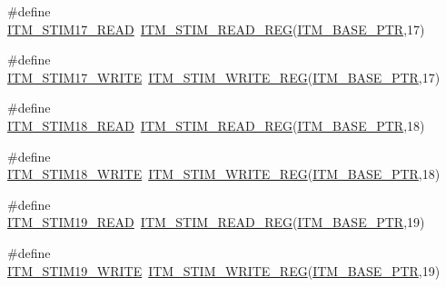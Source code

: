 \begin{DoxyCompactItemize}
\item 
\#define \hyperlink{group___i_t_m___register___accessor___macros_ga3f00966b4f023808c0d22b5c88d9ad84}{I\+T\+M\+\_\+\+S\+T\+I\+M17\+\_\+\+R\+E\+AD}~\hyperlink{group___i_t_m___register___accessor___macros_ga5009882336aadcd4f37b45cf3395c450}{I\+T\+M\+\_\+\+S\+T\+I\+M\+\_\+\+R\+E\+A\+D\+\_\+\+R\+EG}(\hyperlink{group___i_t_m___peripheral_gafaddee8fe8b6a898d4e5edc43ee0d703}{I\+T\+M\+\_\+\+B\+A\+S\+E\+\_\+\+P\+TR},17)
\item 
\#define \hyperlink{group___i_t_m___register___accessor___macros_gab955a13756ae2b569880dbef823a29a4}{I\+T\+M\+\_\+\+S\+T\+I\+M17\+\_\+\+W\+R\+I\+TE}~\hyperlink{group___i_t_m___register___accessor___macros_ga049ca92a4e78e77c19af81e51aa73f1c}{I\+T\+M\+\_\+\+S\+T\+I\+M\+\_\+\+W\+R\+I\+T\+E\+\_\+\+R\+EG}(\hyperlink{group___i_t_m___peripheral_gafaddee8fe8b6a898d4e5edc43ee0d703}{I\+T\+M\+\_\+\+B\+A\+S\+E\+\_\+\+P\+TR},17)
\item 
\#define \hyperlink{group___i_t_m___register___accessor___macros_ga4d40ae88921303412c9628a350572a8a}{I\+T\+M\+\_\+\+S\+T\+I\+M18\+\_\+\+R\+E\+AD}~\hyperlink{group___i_t_m___register___accessor___macros_ga5009882336aadcd4f37b45cf3395c450}{I\+T\+M\+\_\+\+S\+T\+I\+M\+\_\+\+R\+E\+A\+D\+\_\+\+R\+EG}(\hyperlink{group___i_t_m___peripheral_gafaddee8fe8b6a898d4e5edc43ee0d703}{I\+T\+M\+\_\+\+B\+A\+S\+E\+\_\+\+P\+TR},18)
\item 
\#define \hyperlink{group___i_t_m___register___accessor___macros_ga1fb39bc1a36c6aed07b8588d2d1c77b0}{I\+T\+M\+\_\+\+S\+T\+I\+M18\+\_\+\+W\+R\+I\+TE}~\hyperlink{group___i_t_m___register___accessor___macros_ga049ca92a4e78e77c19af81e51aa73f1c}{I\+T\+M\+\_\+\+S\+T\+I\+M\+\_\+\+W\+R\+I\+T\+E\+\_\+\+R\+EG}(\hyperlink{group___i_t_m___peripheral_gafaddee8fe8b6a898d4e5edc43ee0d703}{I\+T\+M\+\_\+\+B\+A\+S\+E\+\_\+\+P\+TR},18)
\item 
\#define \hyperlink{group___i_t_m___register___accessor___macros_gaae6a230f21e1fb36ab999e662677ac65}{I\+T\+M\+\_\+\+S\+T\+I\+M19\+\_\+\+R\+E\+AD}~\hyperlink{group___i_t_m___register___accessor___macros_ga5009882336aadcd4f37b45cf3395c450}{I\+T\+M\+\_\+\+S\+T\+I\+M\+\_\+\+R\+E\+A\+D\+\_\+\+R\+EG}(\hyperlink{group___i_t_m___peripheral_gafaddee8fe8b6a898d4e5edc43ee0d703}{I\+T\+M\+\_\+\+B\+A\+S\+E\+\_\+\+P\+TR},19)
\item 
\#define \hyperlink{group___i_t_m___register___accessor___macros_ga0dcaa81a5a092538e5d2184087988886}{I\+T\+M\+\_\+\+S\+T\+I\+M19\+\_\+\+W\+R\+I\+TE}~\hyperlink{group___i_t_m___register___accessor___macros_ga049ca92a4e78e77c19af81e51aa73f1c}{I\+T\+M\+\_\+\+S\+T\+I\+M\+\_\+\+W\+R\+I\+T\+E\+\_\+\+R\+EG}(\hyperlink{group___i_t_m___peripheral_gafaddee8fe8b6a898d4e5edc43ee0d703}{I\+T\+M\+\_\+\+B\+A\+S\+E\+\_\+\+P\+TR},19)

\end{DoxyCompactItemize}
